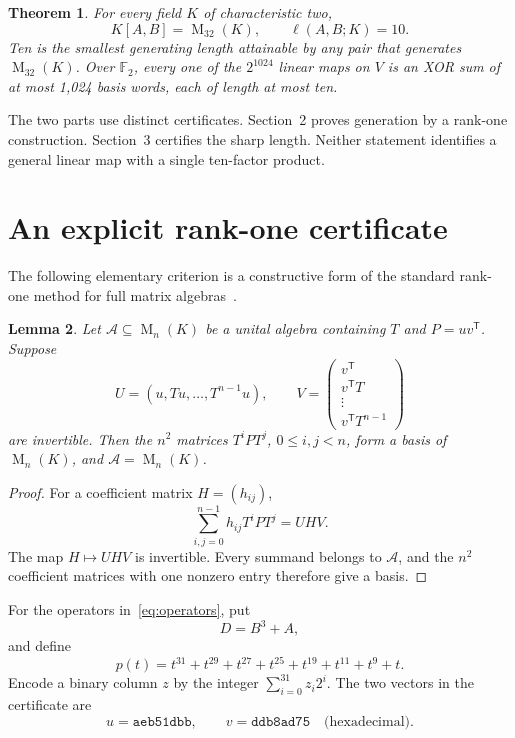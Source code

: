 \documentclass[11pt,a4paper]{article}
\newtheorem{theorem}{Theorem}
\newtheorem{lemma}[theorem]{Lemma}
\theoremstyle{definition}\newtheorem{definition}[theorem]{Definition}
\newcommand{\F}{\mathbb F_2}
\newcommand{\Mat}{\operatorname{M}}
\begin{document}
\begin{theorem}\label{thm:main}
For every field $K$ of characteristic two,
\begin{equation}\label{eq:main}
 K[A,B]=\Mat_{32}(K),\qquad \ell(A,B;K)=10.
\end{equation}
Ten is the smallest generating length attainable by any pair that generates
$\Mat_{32}(K)$. Over $\F$, every one of the $2^{1024}$ linear maps on $V$
is an XOR sum of at most 1,024 basis words, each of length at most ten.
\end{theorem}
The two parts use distinct certificates. Section~2 proves generation by a
rank-one construction. Section~3 certifies the sharp length. Neither
statement identifies a general linear map with a single ten-factor product.

\section{An explicit rank-one certificate}
The following elementary criterion is a constructive form of the standard
rank-one method for full matrix algebras~\cite{radjabalipour}.

\begin{lemma}\label{lem:cyclic}
Let $\mathcal A\subseteq\Mat_n(K)$ be a unital algebra containing $T$ and
$P=uv^{\mathsf T}$. Suppose
\[
 U=(u,Tu,\ldots,T^{n-1}u),\qquad
 V=\begin{pmatrix}v^{\mathsf T}\\v^{\mathsf T}T\\\vdots\\v^{\mathsf T}T^{n-1}\end{pmatrix}
\]
are invertible. Then the $n^2$ matrices $T^iPT^j$, $0\leq i,j<n$, form
a basis of $\Mat_n(K)$, and $\mathcal A=\Mat_n(K)$.
\end{lemma}
\begin{proof}
For a coefficient matrix $H=(h_{ij})$,
\begin{equation}\label{eq:expansion}
 \sum_{i,j=0}^{n-1} h_{ij}T^iPT^j=UHV.
\end{equation}
The map $H\mapsto UHV$ is invertible. Every summand belongs to
$\mathcal A$, and the $n^2$ coefficient matrices with one nonzero entry
therefore give a basis.
\end{proof}

For the operators in~\eqref{eq:operators}, put
\begin{equation}\label{eq:D}
 D=B^3+A,
\end{equation}
and define
\begin{equation}\label{eq:p}
 p(t)=t^{31}+t^{29}+t^{27}+t^{25}+t^{19}+t^{11}+t^9+t.
\end{equation}
Encode a binary column $z$ by the integer $\sum_{i=0}^{31}z_i2^i$.
The two vectors in the certificate are
\begin{equation}\label{eq:uv}
 u=\texttt{aeb51dbb},\qquad v=\texttt{ddb8ad75}
 \quad\text{(hexadecimal)}.
\end{equation}
\end{document}
